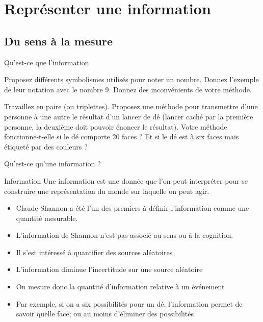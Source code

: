 \section{Représenter une information}
\subsection{Du sens à la mesure}
\begin{exercice}
  \begin{exercicelet}{Qu'est-ce que l'information}
    \begin{questions}
    \item Proposez différents symbolismes utilisés pour noter un
      nombre. Donnez l'exemple de leur notation avec le nombre 9. Donnez des
      inconvénients de votre méthode.
    \item Travaillez en paire (ou triplettes). Proposez une méthode pour
      transmettre d'une personne à une autre le résultat d'un lancer de dé
      (lancer caché par la première personne, la deuxième doit pouvoir énoncer
      le résultat). Votre méthode fonctionne-t-elle si le dé comporte 20
      faces ? Et si le dé est à six faces mais étiqueté par des couleurs ?
    \end{questions}
  \end{exercicelet}
\end{exercice}
\begin{frame}{Qu'est-ce qu'une information ?}
  \begin{block}{Information}
    Une information est une donnée que l'on peut interpréter pour se
    construire une représentation du monde sur laquelle on peut agir.
  \end{block}
  \begin{itemize}
  \item[\dialoginformation] Claude Shannon a été l'un des premiers à
    définir l'information comme une quantité mesurable.
  \item[\dialogwarning] L'information de Shannon n'est pas associé au
    sens ou à la cognition.
  \item Il s'est intéressé à quantifier des sources aléatoires
  \item L'information diminue l'incertitude sur une source aléatoire
  \item On mesure donc la quantité d'information relative à un événement
  \item Par exemple, si on a six possibilités pour un dé, l'information
    permet de savoir quelle face; ou au moins d'éliminer des
    possibilités
  \end{itemize}
\end{frame}

